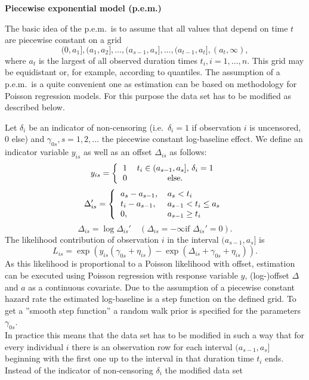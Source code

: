 \textbf{Piecewise exponential model (p.e.m.)}

The basic idea of the p.e.m.~is to assume that all values that
depend on time $t$ are piecewise constant on a grid
\[
(0,a_1],(a_1,a_2],\ldots,(a_{s-1},a_s],\ldots,(a_{t-1},a_t],(a_t,\infty),
\]
where $a_t$ is the largest of all observed duration times
$t_i,i=1,\ldots,n$. This grid may be equidistant or, for example,
according to quantiles. The assumption of a p.e.m.~is a quite
convenient one as estimation can be based on methodology for
Poisson regression models. For this purpose the data set has to be
modified as described below.

Let $\delta_i$ be an indicator of non-censoring (i.e.~$\delta_i=1$
if observation $i$ is uncensored, 0 else) and
$\gamma_{0s},s=1,2,\ldots$ the piecewise constant log-baseline
effect. We define an indicator variable $y_{is}$ as well as an
offset $\Delta_{is}$ as follows:
\[
y_{is}=\left\{
 \begin{tabular}{cc}
1 & $t_i\in (a_{s-1},a_s]$, $\delta_i=1$\\0 & else.
 \end{tabular}
 \right.
\]
\vspace{0.05cm}
\[
\Delta_{is}'=\left\{\begin{tabular}{ll} $a_s-a_{s-1}$,&$a_s<t_i$ \\ $t_i-a_{s-1}$,&$a_{s-1}<t_i\le a_s$ \\
0, &$a_{s-1}\ge t_i$
\end{tabular}\right.
\]
\[
\Delta_{is}=\log{\Delta_{is}'} \quad (\Delta_{is}=-\infty \textrm{
if } \Delta_{is}'=0).
\]
The likelihood contribution of observation $i$ in the interval
$(a_{s-1},a_s]$ is
\[
L_{is}=\exp\left(y_{is}(\gamma_{0s}+\eta_{is})-\exp(\Delta_{is}+\gamma_{0s}+\eta_{is})\right).
\]
As this likelihood is proportional to a Poisson likelihood with
offset, estimation can be executed using Poisson regression with
response variable $y$, (log-)offset $\Delta$ and $a$ as a
continuous covariate. Due to the assumption of a piecewise
constant hazard rate the estimated log-baseline is a step function
on the defined grid. To get a ''smooth step function'' a random
walk prior is specified
for the parameters $\gamma_{0s}$.\\
In practice this means that the data set has to be modified in
such a way that for every individual $i$ there is an observation
row for each interval $(a_{s-1},a_s]$ beginning with the first one
up to the interval in that duration time $t_i$ ends. Instead of
the indicator of non-censoring $\delta_i$ the modified data set
